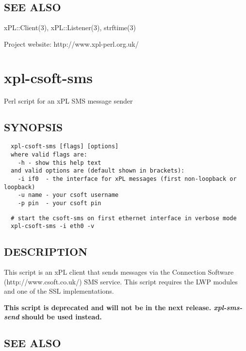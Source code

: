 \subsection*{SEE ALSO\label{xpl-clock_SEE_ALSO}}


xPL::Client(3), xPL::Listener(3), strftime(3)



Project website: http://www.xpl-perl.org.uk/

\section{xpl-csoft-sms\label{xpl-csoft-sms}}


Perl script for an xPL SMS message sender

\subsection*{SYNOPSIS\label{xpl-csoft-sms_SYNOPSIS}}
\begin{verbatim}
  xpl-csoft-sms [flags] [options]
  where valid flags are:
    -h - show this help text
  and valid options are (default shown in brackets):
    -i if0  - the interface for xPL messages (first non-loopback or loopback)
    -u name - your csoft username
    -p pin  - your csoft pin
\end{verbatim}
\begin{verbatim}
  # start the csoft-sms on first ethernet interface in verbose mode
  xpl-csoft-sms -i eth0 -v
\end{verbatim}
\subsection*{DESCRIPTION\label{xpl-csoft-sms_DESCRIPTION}}


This script is an xPL client that sends messages via the Connection
Software (http://www.csoft.co.uk/) SMS service.  This script requires
the LWP modules and one of the SSL implementations.



\textbf{This script is deprecated and will not be in the next release.
\emph{xpl-sms-send} should be used instead.}

\subsection*{SEE ALSO\label{xpl-csoft-sms_SEE_ALSO}}


